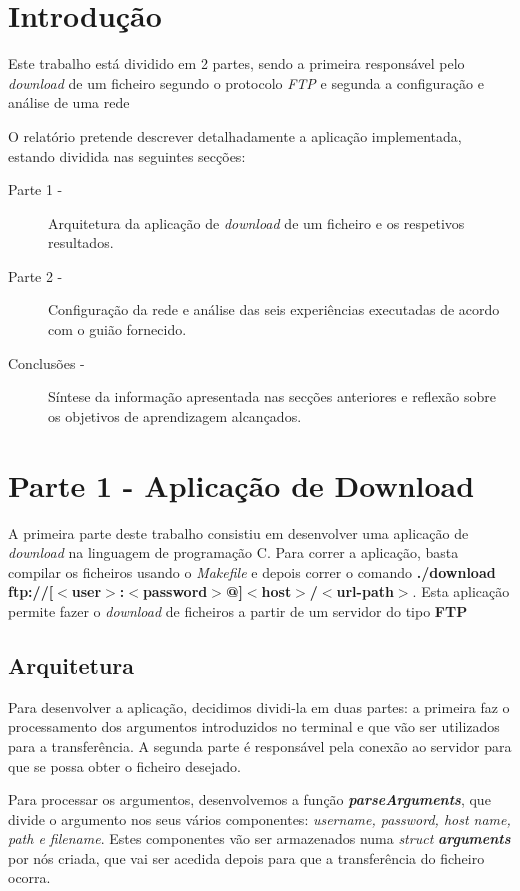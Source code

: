 \documentclass[11pt]{article}
\begin{document}
\section{Introdução}
Este trabalho está dividido em 2 partes, sendo a primeira responsável pelo \emph{download} de um ficheiro segundo o protocolo \emph{FTP} e segunda a configuração e análise de uma rede

O relatório pretende descrever detalhadamente a aplicação implementada, estando dividida nas seguintes secções:
\begin{description}
	\item[Parte 1 -] Arquitetura da aplicação de \emph{download} de um ficheiro e os respetivos resultados.
	\item[Parte 2 -] Configuração da rede e análise das seis experiências executadas de acordo com o guião fornecido.
	\item[Conclusões - ] Síntese da informação apresentada nas secções anteriores e reflexão sobre os objetivos de aprendizagem alcançados.
\end{description}


\section{Parte 1 - Aplicação de Download}
A primeira parte deste trabalho consistiu em desenvolver uma aplicação de \emph{download} na linguagem de programação C. Para correr a aplicação, basta compilar os ficheiros usando o \emph{Makefile} e depois correr o comando \textbf{./download ftp://[$<$user$>$:$<$password$>$@]$<$host$>$/$<$url-path$>$}. Esta aplicação permite fazer o \textit{download} de ficheiros a partir de um servidor do tipo \textbf{FTP}

\subsection{Arquitetura}
Para desenvolver a aplicação, decidimos dividi-la em duas partes: a primeira faz o processamento dos argumentos introduzidos no terminal e que vão ser utilizados para a transferência. A segunda parte é responsável pela conexão ao servidor para que se possa obter o ficheiro desejado.

Para processar os argumentos, desenvolvemos a função \textit{\textbf{parseArguments}}, que divide o argumento nos seus vários componentes: \emph{username, password, host name, path e filename}. Estes componentes vão ser armazenados numa \textit{struct} \textit{\textbf{arguments}} por nós criada, que vai ser acedida depois para que a transferência do ficheiro ocorra.
\end{document}
